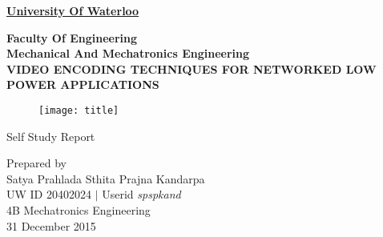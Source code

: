 \pagestyle{empty}

\begin{titlepage}
        \begin{center}

        \Large
        {\bf \sc \underline{University Of Waterloo}}
        
        \normalsize
        {\bf \sc Faculty Of Engineering \\
        Mechanical And Mechatronics Engineering} \\

        \vspace*{1.0cm}
        \Large
        {\bf \uppercase{Video encoding techniques for networked low power applications}}
        
        \vspace*{1.5cm}
        \normalsize
        \begin{figure}[h!]
        \centering
        \texttt{[image: title]}
        \label{fig:tit}
        \end{figure}
        
        \vfill
        {\sc Self Study Report}

        \vspace*{1cm}
        Prepared by\\
        {\sc Satya Prahlada Sthita Prajna Kandarpa \\
        UW ID 20402024 $\vert$ Userid \textit{spspkand} \\ 
        4B Mechatronics Engineering \\
        31 December 2015}

        \end{center}
\end{titlepage}



\cleardoublepage %

